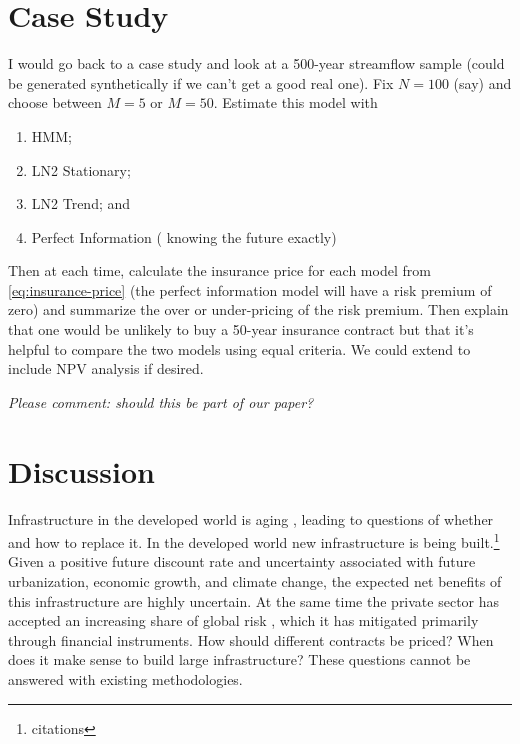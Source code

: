 \documentclass[12pt]{article}
\begin{document}
\section{Case Study}

I would go back to a case study and look at a 500-year streamflow sample (could be generated synthetically if we can't get a good real one).
Fix $N=100$ (say) and choose between $M=5$ or $M=50$. 
Estimate this model with 
\begin{enumerate}[label=(\roman*)]
  \item HMM;
  \item LN2 Stationary;
  \item LN2 Trend; and
  \item Perfect Information (\ie{} knowing the future exactly)
\end{enumerate}
Then at each time, calculate the insurance price for each model from \cref{eq:insurance-price} (the perfect information model will have a risk premium of zero) and summarize the over or under-pricing of the risk premium.
Then explain that one would be unlikely to buy a 50-year insurance contract but that it's helpful to compare the two models using equal criteria.
We could extend to include NPV analysis if desired.

\emph{Please comment: should this be part of our paper?}


\section{Discussion}

Infrastructure in the developed world is aging \citep{Ho2017}, leading to questions of whether and how to replace it.
In the developed world new infrastructure is being built.\footnote{citations}
Given a positive future discount rate and uncertainty associated with future urbanization, economic growth, and climate change, the expected net benefits of this infrastructure are highly uncertain.
At the same time the private sector has accepted an increasing share of global risk \citep{WorldEconomicForum2016}, which it has mitigated primarily through financial instruments.
How should different contracts be priced? When does it make sense to build large infrastructure?
These questions cannot be answered with existing methodologies.
\end{document}
